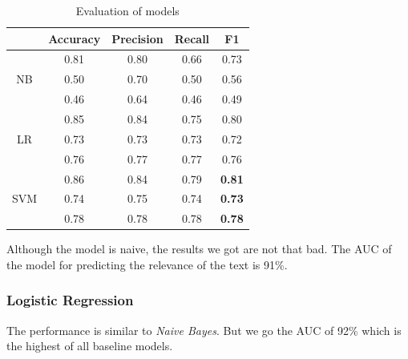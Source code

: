 \documentclass[11pt,a4paper]{article}
\begin{document}
\begin{table}[h]
    \centering
    \begin{tabular}{c | c c c c}
         & Accuracy & Precision & Recall & F1 \\ 
    \hline
    \multirow{3}{*}{NB} & 0.81 & 0.80 & 0.66 & 0.73 \\
                & 0.50 & 0.70 & 0.50 & 0.56 \\
                & 0.46 & 0.64 & 0.46 & 0.49 \\
    \hline
    \multirow{3}{*}{LR} & 0.85 & 0.84 & 0.75 & 0.80 \\
                & 0.73 & 0.73 & 0.73 & 0.72 \\
                & 0.76 & 0.77 & 0.77 & 0.76 \\
    \hline
    \multirow{3}{*}{SVM} & 0.86 & 0.84 & 0.79 & \textbf{0.81} \\
                & 0.74 & 0.75 & 0.74 & \textbf{0.73} \\
                & 0.78 & 0.78 & 0.78 & \textbf{0.78} \\
    
    \end{tabular}
    \caption{Evaluation of models}
    \label{tab:tab1}
\end{table}



Although the model is naive, the results we got are not that bad.
The AUC of the model for predicting the relevance of the text is 91\%.

\subsubsection{Logistic Regression}


The performance is similar to \textit{Naive Bayes}.
But we go the AUC of 92\% which is the highest of all baseline models.
\end{document}
